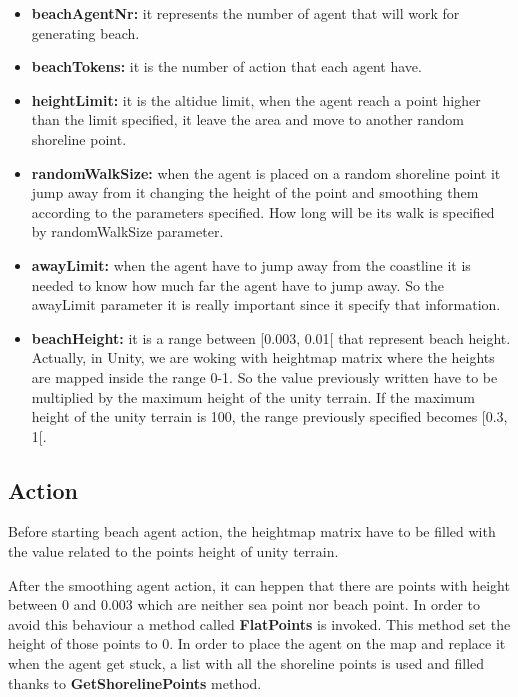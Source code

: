 \documentclass[12pt]{article}
\begin{document}
    \begin{itemize}
        \item \textbf{beachAgentNr:} it represents the number of agent that will work for generating beach.
        \item \textbf{beachTokens:} it is the number of action that each agent have.
        \item \textbf{heightLimit:} it is the altidue limit, when the agent reach a point higher than the limit specified, it leave the area
        and move to another random shoreline point.
        \item \textbf{randomWalkSize:} when the agent is placed on a random shoreline point it jump away from it changing the height of
        the point and smoothing them according to the parameters specified. How long will be its walk is specified by randomWalkSize parameter.
        \item \textbf{awayLimit:} when the agent have to jump away from the coastline it is needed to know how much far the agent have to jump away.
        So the awayLimit parameter it is really important since it specify that information.
        \item \textbf{beachHeight:} it is a range between [0.003, 0.01[ that represent beach height. Actually, in Unity, we are woking with heightmap
        matrix where the heights are mapped inside the range 0-1. So the value previously written have to be multiplied by the maximum height of the 
        unity terrain. If the maximum height of the unity terrain is 100, the range previously specified becomes [0.3, 1[.
    \end{itemize}

    \subsection{Action}
    Before starting beach agent action, the heightmap matrix have to be filled with the value related to the points height of unity terrain.
    
    \noindent
    After the smoothing agent action, it can heppen that there are points with height between 0 and 0.003 which are neither sea point nor beach point. In 
    order to avoid this behaviour a method called \textbf{FlatPoints} is invoked. This method set the height of those points to 0.
    In order to place the agent on the map and replace it when the agent get stuck, a list with all the shoreline points is used and filled thanks to \textbf{GetShorelinePoints}
    method.
    
\end{document}
